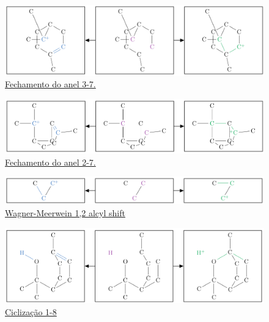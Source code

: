 \begin{figure}[H]
	\centering
	\includegraphics[width=.925\textwidth]{images/r10.png}
	\caption{\href{https://github.com/waldeyr/2PathTerpenes/blob/master/rules/3\%2C7-closure.gml}{Fechamento do anel 3-7.}}
	\label{figRule10}
\end{figure}


\begin{figure}[H]
	\centering
	\includegraphics[width=.925\textwidth]{images/r11.png}
	\caption{\href{https://github.com/waldeyr/2PathTerpenes/blob/master/rules/2\%2C7-closure.gml}{Fechamento do anel 2-7.}}
	\label{figRule11}
\end{figure}


\begin{figure}[H]
	\centering
	\includegraphics[width=.925\textwidth]{images/r12.png}
	\caption{\href{https://github.com/waldeyr/2PathTerpenes/blob/master/rules/WMshift.gml}{Wagner-Meerwein 1,2 alcyl shift}}
	\label{figRule12}
\end{figure}

\begin{figure}[H]
	\centering
	\includegraphics[width=.925\textwidth]{images/r13.png}
	\caption{\href{https://github.com/waldeyr/2PathTerpenes/blob/master/rules/1-8-cyc.gml}{Ciclização 1-8}}
	\label{figRule13}
\end{figure}


